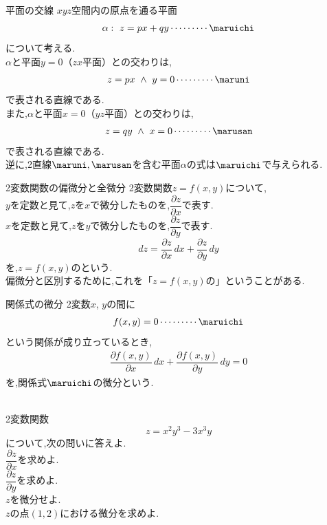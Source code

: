 \documentclass[10pt,fleqn,a4paper]{jsarticle}
\newcommand{\ans}[1]{\mbox{\boldmath{$#1$}}}
\begin{document}
\begin{itembox}[l]{\enpitu 平面の交線}
$xyz$空間内の原点を通る平面
\begin{align*}
\alpha:\ z=px+qy\cdots\cdots\cdots\maruichi
\end{align*}
について考える.\\
$\alpha$と平面$y=0$（$zx$平面）との交わりは,
\begin{align*}
z=px\ \wedge\ y=0\cdots\cdots\cdots\maruni
\end{align*}
で表される直線である.\\
また,$\alpha$と平面$x=0$（$yz$平面）との交わりは,
\begin{align*}
z=qy\ \wedge\ x=0\cdots\cdots\cdots\marusan
\end{align*}
で表される直線である.\\
逆に,2直線$\maruni,\marusan$を含む平面$\alpha$の式は$\maruichi$で与えられる.
\end{itembox}

\begin{itembox}[l]{\enpitu 2変数関数の偏微分と全微分}
2変数関数$z=f(x,y)$について,\\
\noindent\kakkoichi
$y$を定数と見て,$z$を$x$で微分したものを,$\dfrac{\partial z}{\partial x}$で表す.\\
\noindent\kakkoni
$x$を定数と見て,$z$を$y$で微分したものを,$\dfrac{\partial z}{\partial y}$で表す.\\
\noindent\kakkosan
\[
dz=\dfrac{\partial z}{\partial x}\,dx
  +\dfrac{\partial z}{\partial y}\,dy
\]
を,$z=f(x,y)$の\ans{微分}という.\\
偏微分と区別するために,これを「$z=f(x,y)$の\ans{全微分}」ということがある.
\end{itembox}

\newpage

\begin{itembox}[l]{\enpitu 関係式の微分}
2変数$x$, $y$の間に
\begin{align*}
f(x,y)=0\cdots\cdots\cdots\maruichi
\end{align*}
という関係が成り立っているとき,
\begin{align*}
\dfrac{\partial f(x,y)}{\partial x}\,dx
+\dfrac{\partial f(x,y)}{\partial y}\,dy
=0
\end{align*}
を,関係式$\maruichi$の微分という.
\end{itembox}

\newpage

\noindent{}\\
2変数関数
\[
z=x^2y^3-3x^3y
\]
について,次の問いに答えよ.\\
\noindent\kakkoichi $\dfrac{\partial z}{\partial x}$を求めよ.\\
\noindent\kakkoni $\dfrac{\partial z}{\partial y}$を求めよ.\\
\noindent\kakkosan $z$を微分せよ.\\
\noindent\kakkoshi $z$の点$(1,2)$における微分を求めよ.\\[2em]
\end{document}
